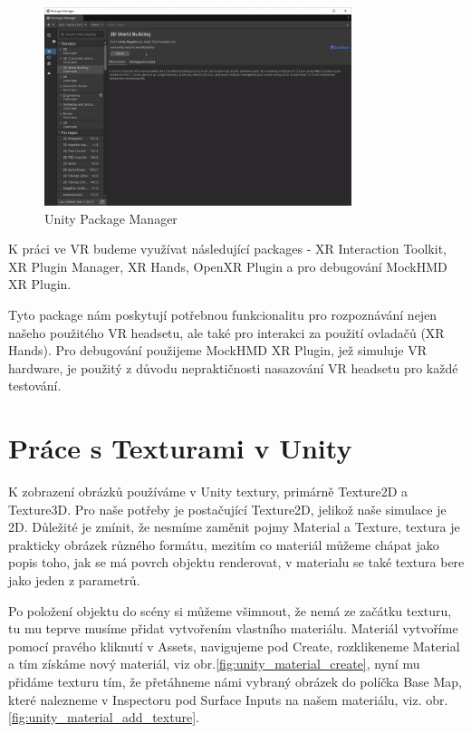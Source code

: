 \documentclass[a4paper,oneside,12pt]{book}
\begin{document}
\begin{figure}[H]
	\centering
	\includegraphics[width=0.8\textwidth]{obrazky/unity_package_manager.png}
	\caption{Unity Package Manager}
	\label{fig:unity_package_manager}
\end{figure}

K práci ve VR budeme využívat následující packages - XR Interaction Toolkit, XR Plugin Manager, XR Hands, OpenXR Plugin a pro debugování MockHMD XR Plugin.

Tyto package nám poskytují potřebnou funkcionalitu pro rozpoznávání nejen našeho použitého VR headsetu, ale také pro interakci za použití ovladačů (XR Hands). Pro debugování použijeme MockHMD XR Plugin, jež simuluje VR hardware, je použitý z důvodu nepraktičnosti nasazování VR headsetu pro každé testování.

\section{Práce s Texturami v Unity}
K zobrazení obrázků používáme v Unity textury, primárně Texture2D\cite{unity_texture_2D} a Texture3D\cite{unity_texture_3D}. Pro naše potřeby je postačující Texture2D, jelikož naše simulace je 2D. Důležité je zmínit, že nesmíme zaměnit pojmy Material a Texture, textura je prakticky obrázek různého formátu, mezitím co materiál můžeme chápat jako popis toho, jak se má povrch objektu renderovat, v materialu se také textura bere jako jeden z parametrů.

Po položení objektu do scény si můžeme všimnout, že nemá ze začátku texturu, tu mu teprve musíme přidat vytvořením vlastního materiálu. Materiál vytvoříme pomocí pravého kliknutí v Assets, navigujeme pod Create, rozklikeneme Material a tím získáme nový materiál, viz obr.\ref{fig:unity_material_create}, nyní mu přidáme texturu tím, že přetáhneme námi vybraný obrázek do políčka Base Map, které nalezneme v Inspectoru pod Surface Inputs na našem materiálu, viz. obr.\ref{fig:unity_material_add_texture}.
\end{document}
